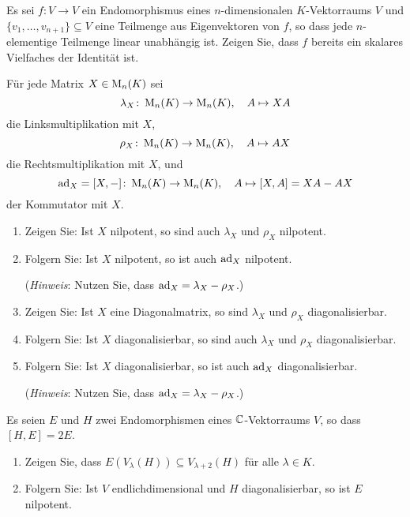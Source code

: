 \begin{question}
  Es sei $f \colon V \to V$ ein Endomorphismus eines $n$-dimensionalen $K$-Vektorraums $V$ und $\{ v_1, \dotsc, v_{n+1} \} \subseteq V$ eine Teilmenge aus Eigenvektoren von $f$, so dass jede $n$-elementige Teilmenge linear unabhängig ist.
  Zeigen Sie, dass $f$ bereits ein skalares Vielfaches der Identität ist.
\end{question}


\begin{question}
  Für jede Matrix $X \in \operatorname{M}_n(K)$ sei
  \[
    \lambda_X \colon \operatorname{M}_n(K) \to \operatorname{M}_n(K),
    \quad
    A \mapsto XA
  \]
  die Linksmultiplikation mit $X$,
  \[
    \rho_X \colon \operatorname{M}_n(K) \to \operatorname{M}_n(K),
    \quad
    A \mapsto AX
  \]
  die Rechtsmultiplikation mit $X$, und
  \[
    \operatorname{ad}_X = [X, -] \colon \operatorname{M}_n(K) \to \operatorname{M}_n(K),
    \quad
    A \mapsto [X, A] = XA - AX
  \]
  der Kommutator mit $X$.
  \begin{enumerate}[leftmargin=*]
    \item
      Zeigen Sie:
      Ist $X$ nilpotent, so sind auch $\lambda_X$ und $\rho_X$ nilpotent.
    \item
      Folgern Sie:
      Ist $X$ nilpotent, so ist auch $\operatorname{ad}_X$ nilpotent.
      
      (\emph{Hinweis}:
      Nutzen Sie, dass $\operatorname{ad}_X = \lambda_X - \rho_X$.)
    \item
      Zeigen Sie:
      Ist $X$ eine Diagonalmatrix, so sind $\lambda_X$ und $\rho_X$ diagonalisierbar.
    \item
      Folgern Sie:
      Ist $X$ diagonalisierbar, so sind auch $\lambda_X$ und $\rho_X$ diagonalisierbar.
    \item
      Folgern Sie:
      Ist $X$ diagonalisierbar, so ist auch $\operatorname{ad}_X$ diagonalisierbar.
      
      (\emph{Hinweis}:
       Nutzen Sie, dass $\operatorname{ad}_X = \lambda_X - \rho_X$.)
  \end{enumerate}
\end{question}


\begin{question}
  Es seien $E$ und $H$ zwei Endomorphismen eines $\mathbb{C}$-Vektorraums $V$, so dass $[H,E] = 2E$.
  \begin{enumerate}[leftmargin=*]
    \item
      Zeigen Sie, dass $E(V_\lambda(H)) \subseteq V_{\lambda + 2}(H)$ für alle $\lambda \in K$.
    \item
      Folgern Sie: Ist $V$ endlichdimensional und $H$ diagonalisierbar, so ist $E$ nilpotent.
  \end{enumerate}
\end{question}










